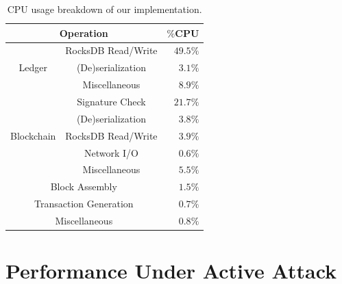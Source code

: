 \begin{table}[ht]
\centering
\caption{\small CPU usage breakdown of our \prism implementation.}
\begin{tabular}{| c | c || r |} 
 \hline
 \multicolumn{2}{|c||}{Operation} & $\%$CPU \\ [0.5ex] 
 \hline\hline
 \multirow{3}{*}{Ledger} & RocksDB Read/Write & $49.5\%$ \\ %
                         & (De)serialization & $3.1\%$\\ %
                         & Miscellaneous & $8.9\%$\\ \hline
 \multirow{5}{*}{Blockchain}    & Signature Check & $21.7\%$ \\ %
                         & (De)serialization & $3.8\%$ \\
                         & RocksDB Read/Write & $3.9\%$ \\
                         & Network I/O & $0.6\%$ \\ %
                         & Miscellaneous & $5.5\%$\\ \hline
  \multicolumn{2}{|c||}{Block Assembly} & $1.5\%$ \\ \hline
 \multicolumn{2}{|c||}{Transaction Generation} & $0.7\%$ \\ \hline
 \multicolumn{2}{|c||}{Miscellaneous} & $0.8\%$ \\ \hline
\end{tabular}
\label{table:profiling}
\end{table}

\section{Performance Under Active Attack}
\label{sec:eval-attack}

